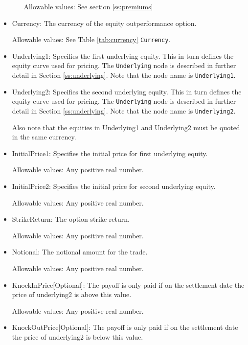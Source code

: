 \begin{itemize}
\begin{itemize}
Allowable values:  See section \ref{ss:premiums}

\end{itemize}



\item Currency: The currency of the equity outperformance option.

Allowable values:  See Table \ref{tab:currency} \lstinline!Currency!.
    
\item Underlying1:  Specifies the first underlying equity.  This in turn defines the equity curve used for pricing. The \lstinline!Underlying! node is described in further detail in Section \ref{ss:underlying}. Note that the node name is \lstinline!Underlying1!.

\item Underlying2:  Specifies the second underlying equity. This in turn defines the equity curve used for pricing. The \lstinline!Underlying! node is described in further detail in Section \ref{ss:underlying}. Note that the node name is \lstinline!Underlying2!.

Also note that the equities in Underlying1 and Underlying2 must be quoted in the same currency.

\item InitialPrice1:  Specifies the initial price for first underlying equity.

Allowable values:  Any positive real number.	
    
\item InitialPrice2:  Specifies the initial price for second underlying equity.

Allowable values:  Any positive real number.	
    
\item StrikeReturn: The option strike return.
    
Allowable values:  Any positive real number.	
    
\item Notional: The notional amount for the trade.
    
Allowable values:  Any positive real number.

\item KnockInPrice[Optional]: The payoff is only paid if on the settlement date the price of underlying2 is above this value.
    
Allowable values:  Any positive real number.

\item KnockOutPrice[Optional]: The payoff is only paid if on the settlement date the price of underlying2 is below this value.
    

\end{itemize}
